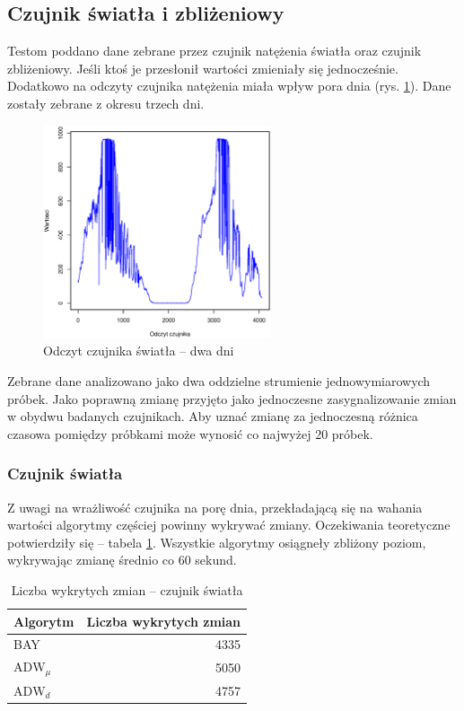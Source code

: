 \subsection{Czujnik światła i zbliżeniowy}
Testom poddano dane zebrane przez czujnik natężenia światła oraz czujnik zbliżeniowy.
Jeśli ktoś je przesłonił wartości zmieniały się jednocześnie.
Dodatkowo na odczyty czujnika natężenia miała wpływ pora dnia (rys. \ref{fig:DeviceLightRes}).
Dane zostały zebrane z okresu trzech dni.
\begin{figure}[htbp]
  \centering
  \includegraphics[width=0.6\textwidth]{img/ch-5-device-light}
  \caption{Odczyt czujnika światła -- dwa dni}
  \label{fig:DeviceLightRes}
\end{figure}

Zebrane dane analizowano jako dwa oddzielne strumienie jednowymiarowych próbek.
Jako poprawną zmianę przyjęto jako jednoczesne zasygnalizowanie zmian w obydwu badanych czujnikach.
Aby uznać zmianę za jednoczesną różnica czasowa pomiędzy próbkami może wynosić co najwyżej 20 próbek.

\subsubsection*{Czujnik światła}
Z uwagi na wrażliwość czujnika na porę dnia,
przekładającą się na wahania wartości algorytmy częściej powinny wykrywać zmiany.
Oczekiwania teoretyczne potwierdziły się -- tabela \ref{tab:LightResutl}.
Wszystkie algorytmy osiągneły zbliżony poziom, wykrywając zmianę średnio co 60 sekund.
\begin{table}[h]
  \label{tab:LightResutl}
  \centering
  \begin{tabular}{l r }
    Algorytm & \multicolumn{1}{l}{Liczba wykrytych zmian} \\
    \hline
    BAY & 4335  \\
    $\mbox{ADW}_{\mu}$ & 5050 \\
    $\mbox{ADW}_{d}$ & 4757  \\
  \end{tabular}
  \caption{Liczba wykrytych zmian -- czujnik światła}
\end{table}
\clearpage
